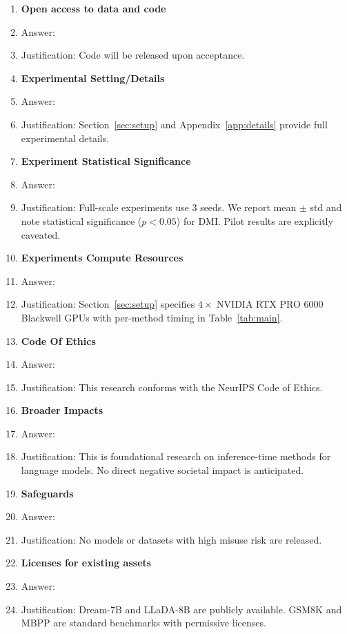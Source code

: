 \documentclass{article}
\begin{document}
\begin{enumerate}
\item {\bf Open access to data and code}
    \item[] Answer: \answerNo{}
    \item[] Justification: Code will be released upon acceptance.

\item {\bf Experimental Setting/Details}
    \item[] Answer: \answerYes{}
    \item[] Justification: Section~\ref{sec:setup} and Appendix~\ref{app:details} provide full experimental details.

\item {\bf Experiment Statistical Significance}
    \item[] Answer: \answerYes{}
    \item[] Justification: Full-scale experiments use 3 seeds. We report mean $\pm$ std and note statistical significance ($p < 0.05$) for DMI. Pilot results are explicitly caveated.

\item {\bf Experiments Compute Resources}
    \item[] Answer: \answerYes{}
    \item[] Justification: Section~\ref{sec:setup} specifies $4{\times}$ NVIDIA RTX PRO 6000 Blackwell GPUs with per-method timing in Table~\ref{tab:main}.

\item {\bf Code Of Ethics}
    \item[] Answer: \answerYes{}
    \item[] Justification: This research conforms with the NeurIPS Code of Ethics.

\item {\bf Broader Impacts}
    \item[] Answer: \answerNA{}
    \item[] Justification: This is foundational research on inference-time methods for language models. No direct negative societal impact is anticipated.

\item {\bf Safeguards}
    \item[] Answer: \answerNA{}
    \item[] Justification: No models or datasets with high misuse risk are released.

\item {\bf Licenses for existing assets}
    \item[] Answer: \answerYes{}
    \item[] Justification: Dream-7B and LLaDA-8B are publicly available. GSM8K and MBPP are standard benchmarks with permissive licenses.


\end{enumerate}
\end{document}
